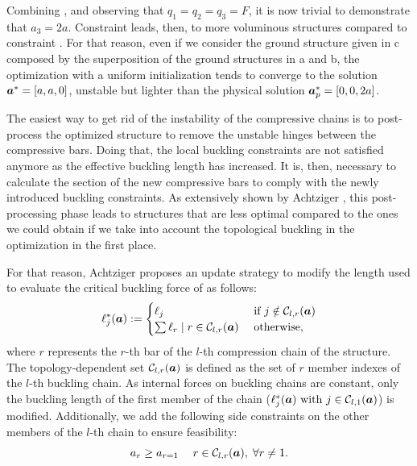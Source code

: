 Combining ,  and observing that $q_1=q_2=q_3=F$, it is now trivial to demonstrate that $a_3=2a$. Constraint  leads, then, to more voluminous structures compared to constraint . For that reason, even if we consider the ground structure given in c composed by the superposition of the ground structures in a and b, the optimization with a uniform initialization tends to converge to the solution $\bm{a}^*=[a,a,0]$, unstable but lighter than the physical solution $\bm{a}_p^*=[0,0,2a]$. 

The easiest way to get rid of the instability of the compressive chains is to post-process the optimized structure to remove the unstable hinges between the compressive bars. Doing that, the local buckling constraints are not satisfied anymore as the effective buckling length has increased. It is, then, necessary to calculate the section of the new compressive bars to comply with the newly introduced buckling constraints. As extensively shown by Achtziger , this post-processing phase leads to structures that are less optimal compared to the ones we could obtain if we take into account the topological buckling in the optimization in the first place.

For that reason, Achtziger proposes an update strategy to modify the length used to evaluate the critical buckling force of  as follows:
\begin{equation}
    \ell^*_j(\bm{a}):= 
    \begin{cases}
        \ell_j & \text { if } j \notin \mathcal{C}_{l,r}(\bm{a}) \\
        \sum \ell_{r} \;|\; r \in \mathcal{C}_{l,r}(\bm{a})  & \text { otherwise,}
    \end{cases}
    \label{eq:chain_len}
\end{equation}
where $r$ represents the $r$-th bar of the $l$-th compression chain of the structure. The topology-dependent set $\mathcal{C}_{l,r}(\bm{a})$ is defined as the set of $r$ member indexes of the $l$-th buckling chain. As internal forces on buckling chains are constant, only the buckling length of the first member of the chain ($\ell^*_j(\bm{a}) \text{ with } j \in \mathcal{C}_{l,1}(\bm{a})$) is modified. Additionally, we add the following side constraints on the other members of the $l$-th chain to ensure feasibility:
\begin{equation}
    a_{r}\geq a_{r=1} \quad \; r \in \mathcal{C}_{l,r}(\bm{a}), \; \forall r \neq 1.
    \label{eq:side_cons_chain}
\end{equation}

